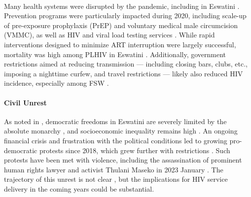\paragraph{\covid}
Many health systems were disrupted by the \covid pandemic, including in Eswatini \cite{EswCOP21}.
Prevention programs were particularly impacted during 2020, including scale-up of
pre-exposure prophylaxis (PrEP) and voluntary medical male circumcision (VMMC),
as well as HIV and viral load testing services \cite{EswCOP21}.
While rapid interventions designed to minimize ART interruption were largely successful,
\covid mortality was high among PLHIV in Eswatini \cite{EswCOP21}.
Additionally, government restrictions aimed at reducing \covid transmission --- including
closing bars, clubs, etc., imposing a nighttime curfew, and travel restrictions \cite{EswIBBS2022}
--- likely also reduced HIV incidence, especially among FSW \cite{Stone2023}.
\paragraph{Civil Unrest}
As noted in ,
democratic freedoms in Eswatini are severely limited by the absolute monarchy \cite{Mthembu2022},
and socioeconomic inequality remains high \cite{Kali2023}.
An ongoing financial crisis and frustration with the political conditions led to
growing pro-democratic protests since 2018,
which grew further with \covid restrictions \cite{Kali2023,Mthembu2022}.
Such protests have been met with violence, including the assassination of
prominent human rights lawyer and activist Thulani Maseko in 2023 January \cite{Maseko2023}.
The trajectory of this unrest is not clear \cite{Maphalala2021},
but the implications for HIV service delivery in the coming years could be substantial.
